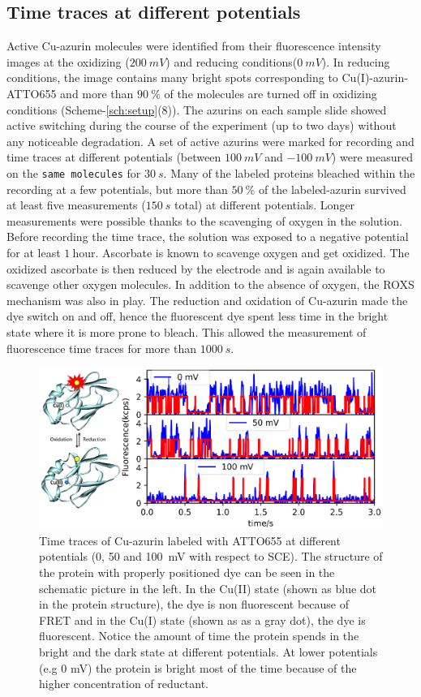 \documentclass[journal=jacsat,manuscript=article]{achemso}
\begin{document}
\subsection{Time traces at different potentials}
Active Cu-azurin molecules were identified from their fluorescence intensity images at the oxidizing ($200~mV$) and reducing conditions($0~mV$). In reducing conditions, the image contains many bright spots corresponding to Cu(I)-azurin-ATTO655 and more than $90~\%$ of the molecules are turned off in oxidizing conditions (Scheme-\ref{sch:setup}(8)). The azurins on each sample slide showed active switching during the course of the experiment (up to two days) without any noticeable degradation. A set of active azurins were marked for recording and time traces at different potentials (between $100~mV$ and $-100~mV$) were measured on the \texttt{same molecules} for $30~s$. Many of the labeled proteins bleached within the recording at a few potentials, but more than $50~$\% of the labeled-azurin survived at least five measurements ($150~s$ total) at different potentials. Longer measurements were possible thanks to the scavenging of oxygen in the solution. Before recording the time trace, the solution was exposed to a negative potential for at least $1~$hour. Ascorbate is known to  scavenge oxygen\cite{dave1997effectiveness} and get oxidized. The oxidized ascorbate is then reduced by the electrode and is again available to scavenge other oxygen molecules. In addition to the absence of oxygen, the ROXS mechanism was also in play.\cite{cordes2009on} The reduction and oxidation of Cu-azurin made the dye switch on and off, hence the fluorescent dye spent less time in the bright state where it is more prone to bleach. This allowed the measurement of fluorescence time traces for more than $1000~s$.\\
\begin{figure}
	\centering
	\includegraphics[]{Figure_1_timetrace_CuAzu.eps}
	\caption{Time traces of Cu-azurin labeled with ATTO655 at different potentials (0, 50 and 100~mV with respect to SCE). The structure of the protein with properly positioned dye can be seen in the schematic picture in the left. In the Cu(II) state (shown as blue dot in the protein structure), the dye is non fluorescent because of FRET and in the Cu(I) state (shown as as a gray dot), the dye is fluorescent. Notice the amount of time the protein spends in the bright and the dark state at different potentials. At lower potentials (e.g 0 mV) the protein is bright most of the time because of the higher concentration of reductant.}
	\label{fig:timetrace}
\end{figure}
\end{document}
